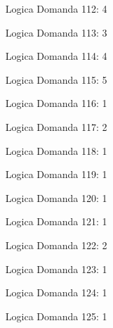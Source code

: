\documentclass[20pt, a4paper]{article}
\begin{document}
\begin{itemize}[leftmargin=*]
\item [Logica] Domanda 112: 4
\item [Logica] Domanda 113: 3
\item [Logica] Domanda 114: 4
\item [Logica] Domanda 115: 5
\item [Logica] Domanda 116: 1
\item [Logica] Domanda 117: 2
\item [Logica] Domanda 118: 1
\item [Logica] Domanda 119: 1
\item [Logica] Domanda 120: 1
\item [Logica] Domanda 121: 1
\item [Logica] Domanda 122: 2
\item [Logica] Domanda 123: 1
\item [Logica] Domanda 124: 1
\item [Logica] Domanda 125: 1
\end{itemize}
\end{document}

